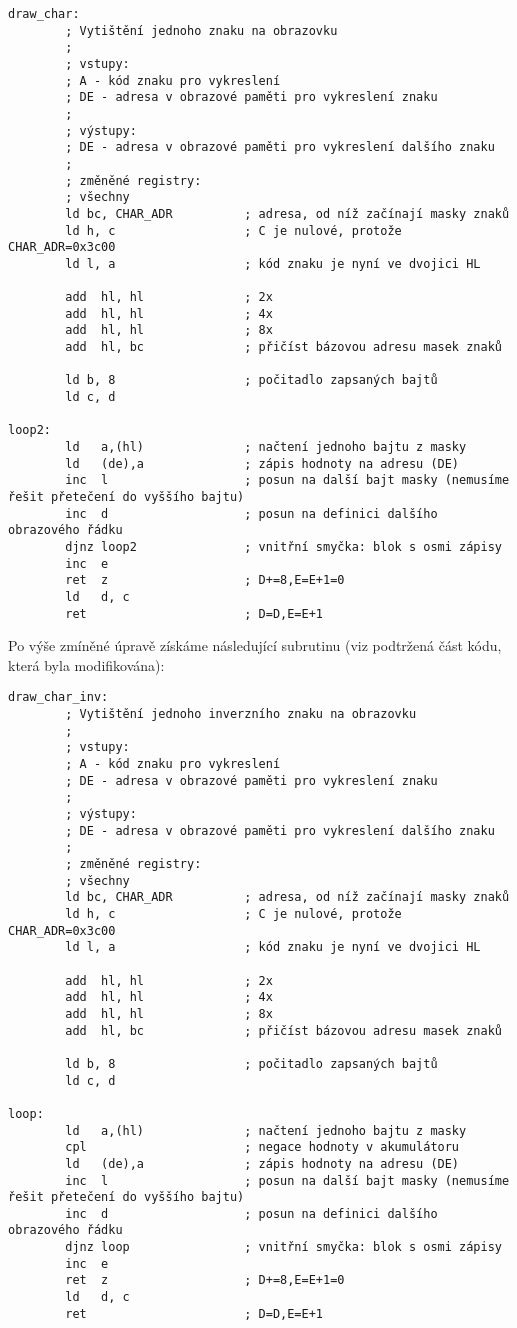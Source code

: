 \documentclass{article}
\begin{document}
\begin{verbatim}
draw_char:
        ; Vytištění jednoho znaku na obrazovku
        ;
        ; vstupy:
        ; A - kód znaku pro vykreslení
        ; DE - adresa v obrazové paměti pro vykreslení znaku
        ;
        ; výstupy:
        ; DE - adresa v obrazové paměti pro vykreslení dalšího znaku
        ;
        ; změněné registry:
        ; všechny
        ld bc, CHAR_ADR          ; adresa, od níž začínají masky znaků
        ld h, c                  ; C je nulové, protože CHAR_ADR=0x3c00
        ld l, a                  ; kód znaku je nyní ve dvojici HL
 
        add  hl, hl              ; 2x
        add  hl, hl              ; 4x
        add  hl, hl              ; 8x
        add  hl, bc              ; přičíst bázovou adresu masek znaků
 
        ld b, 8                  ; počitadlo zapsaných bajtů
        ld c, d
 
loop2:
        ld   a,(hl)              ; načtení jednoho bajtu z masky
        ld   (de),a              ; zápis hodnoty na adresu (DE)
        inc  l                   ; posun na další bajt masky (nemusíme řešit přetečení do vyššího bajtu)
        inc  d                   ; posun na definici dalšího obrazového řádku
        djnz loop2               ; vnitřní smyčka: blok s osmi zápisy
        inc  e
        ret  z                   ; D+=8,E=E+1=0
        ld   d, c
        ret                      ; D=D,E=E+1
\end{verbatim}

Po výše zmíněné úpravě získáme následující subrutinu (viz podtržená část
kódu, která byla modifikována):

\begin{verbatim}
draw_char_inv:
        ; Vytištění jednoho inverzního znaku na obrazovku
        ;
        ; vstupy:
        ; A - kód znaku pro vykreslení
        ; DE - adresa v obrazové paměti pro vykreslení znaku
        ;
        ; výstupy:
        ; DE - adresa v obrazové paměti pro vykreslení dalšího znaku
        ;
        ; změněné registry:
        ; všechny
        ld bc, CHAR_ADR          ; adresa, od níž začínají masky znaků
        ld h, c                  ; C je nulové, protože CHAR_ADR=0x3c00
        ld l, a                  ; kód znaku je nyní ve dvojici HL
 
        add  hl, hl              ; 2x
        add  hl, hl              ; 4x
        add  hl, hl              ; 8x
        add  hl, bc              ; přičíst bázovou adresu masek znaků
 
        ld b, 8                  ; počitadlo zapsaných bajtů
        ld c, d
 
loop:
        ld   a,(hl)              ; načtení jednoho bajtu z masky
        cpl                      ; negace hodnoty v akumulátoru
        ld   (de),a              ; zápis hodnoty na adresu (DE)
        inc  l                   ; posun na další bajt masky (nemusíme řešit přetečení do vyššího bajtu)
        inc  d                   ; posun na definici dalšího obrazového řádku
        djnz loop                ; vnitřní smyčka: blok s osmi zápisy
        inc  e
        ret  z                   ; D+=8,E=E+1=0
        ld   d, c
        ret                      ; D=D,E=E+1
\end{verbatim}
\end{document}
